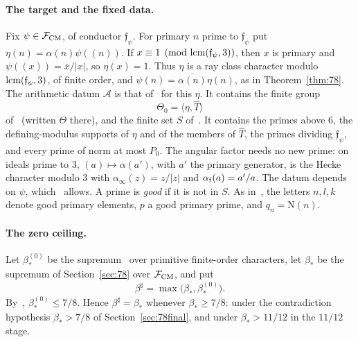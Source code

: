 \documentclass[11pt]{article}
\numberwithin{equation}{section}
\newcommand{\N}{\mathrm N}
\begin{document}
\paragraph{The target and the fixed data.} Fix $\psi\in\mathcal F_{\rm CM}$, of conductor
$\mathfrak f_\psi$. For primary $n$ prime to $\mathfrak f_\psi$ put $\eta(n)=\alpha(n)\psi((n))$. If
$x\equiv1\pmod{{\rm lcm}(\mathfrak f_\psi,3)}$, then $x$ is primary and $\psi((x))=\bar x/|x|$, so
$\eta(x)=1$. Thus $\eta$ is a ray class character modulo ${\rm lcm}(\mathfrak f_\psi,3)$, of finite
order, and $\psi(n)=\overline{\alpha(n)}\eta(n)$, as in Theorem~\ref{thm:78}. The arithmetic
datum $\mathcal A$ is that of~\cite[Section~4.1]{OAI78} for this $\eta$. It contains the finite
group
\begin{equation}\label{eq:d161}
 \Theta_0=\langle\eta,\widehat T\rangle
\end{equation}
of~\cite[Section~6.1]{OAI78} (written $\Theta$ there), and the finite set $S$ of~\cite[Section~6.1]{OAI78}.
It contains the primes above $6$, the defining-modulus supports of $\eta$ and of the members of
$\widehat T$, the primes dividing $\mathfrak f_\psi$, and every prime of norm at most $P_0$. The angular factor needs no new prime: on ideals prime to $3$,
$(a)\mapsto\alpha(a')$, with $a'$ the primary generator, is the Hecke character modulo $3$ with
$\alpha_\infty(z)=z/|z|$ and $\alpha_{\rm f}(a)=a'/a$. The datum depends on $\psi$, which~\cite[Section~4.1]{OAI78} allows. A prime is \emph{good} if it is not in $S$. As in~\cite[Section~4.1]{OAI78},
the letters $n,l,k$ denote good primary elements, $p$ a good primary prime, and $q_n=\N(n)$.

\paragraph{The zero ceiling.} Let $\beta_*^{(0)}$ be the supremum~\cite[eq.~(2.1)]{OAI78} over
primitive finite-order characters, let $\beta_*$ be the supremum of Section~\ref{sec:78} over
$\mathcal F_{\rm CM}$, and put
\begin{equation}\label{eq:s3-beta}
 \beta^\sharp=\max\bigl(\beta_*,\beta_*^{(0)}\bigr).
\end{equation}
By~\cite[Theorem~1.1]{OAI78}, $\beta_*^{(0)}\le7/8$. Hence $\beta^\sharp=\beta_*$ whenever
$\beta_*\ge7/8$: under the contradiction hypothesis $\beta_*>7/8$ of Section~\ref{sec:78final}, and under
$\beta_*>11/12$ in the $11/12$ stage.
\end{document}
